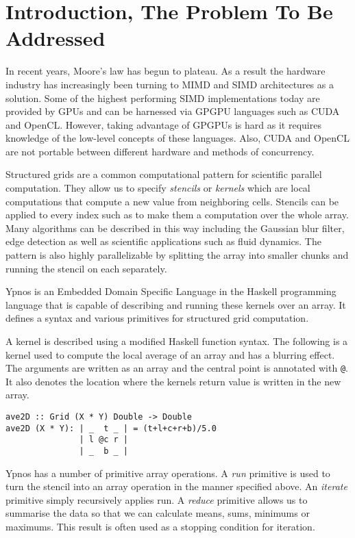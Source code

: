 


\section*{Introduction, The Problem To Be Addressed}

In recent years, Moore's law has begun to plateau. As a result the hardware
industry has increasingly been turning to MIMD and SIMD architectures as a
solution.  Some of the highest performing SIMD implementations today are
provided by GPUs and can be harnessed via GPGPU languages such as CUDA and
OpenCL.  However, taking advantage of GPGPUs is hard as it requires knowledge
of the low-level concepts of these languages. Also, CUDA and OpenCL are not
portable between different hardware and methods of concurrency.

Structured grids are a common computational pattern for scientific parallel
computation. They allow us to specify \emph{stencils} or \emph{kernels} which
are local computations that compute a new value from neighboring cells.
Stencils can be applied to every index such as to make them a computation over
the whole array.  Many algorithms can be described in this way including the
Gaussian blur filter, edge detection as well as scientific applications such as
fluid dynamics. The pattern is also highly parallelizable by splitting the
array into smaller chunks and running the stencil on each separately.

Ypnos \cite{ypnos-damp10} is an Embedded Domain Specific Language in the Haskell
programming language that is capable of describing and running these kernels
over an array.  It defines a syntax and various primitives for structured grid
computation.

A kernel is described using a modified Haskell function syntax. The following
is a kernel used to compute the local average of an array and has a blurring
effect.  The arguments are written as an array and the central point is
annotated with \verb|@|. It also denotes the location where the kernels return
value is written in the new array.

\begin{verbatim}
ave2D :: Grid (X * Y) Double -> Double
ave2D (X * Y): | _  t _ | = (t+l+c+r+b)/5.0
               | l @c r |
               | _  b _ |
\end{verbatim}

Ypnos has a number of primitive array operations. A \emph{run} primitive is
used to turn the stencil into an array operation in the manner specified above.
An \emph{iterate} primitive simply recursively applies run.  A \emph{reduce}
primitive allows us to summarise the data so that we can calculate means, sums,
minimums or maximums.  This result is often used as a stopping condition for
iteration.

